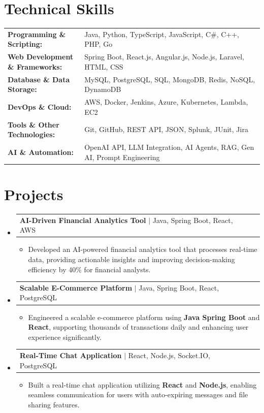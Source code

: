 \documentclass[letterpaper,10pt]{article}
\makeatletter
\newcommand{\resumeItem}[1]{
  \item{\fontsize{8pt}{9pt}\selectfont
    #1 \vspace{-3pt}
  }
}
\newcommand{\resumeProjectHeading}[2]{
    \item
    \begin{tabular*}{1.001\textwidth}{l@{\extracolsep{\fill}}r}
      \fontsize{8.5pt}{10pt}#1 & \textbf{\fontsize{8.5pt}{10pt} #2}\\
    \end{tabular*}\vspace{-7pt}
}
\newcommand{\resumeSubHeadingListStart}{\begin{itemize}[leftmargin=0pt, label={}]}
\newcommand{\resumeSubHeadingListEnd}{\end{itemize}}
\newcommand{\resumeItemListStart}{\begin{itemize}[leftmargin=*]}
\newcommand{\resumeItemListEnd}{\end{itemize}\vspace{-5pt}}
\makeatother
\begin{document}
\section{Technical Skills}
        \vspace{-14pt}
        \begin{table}[h]
            \fontsize{8pt}{9pt}\selectfont
            \begin{tabular}{p{0.3\linewidth} p{0.7\linewidth}}
                \textbf{Programming \& Scripting:} & Java, Python, TypeScript, JavaScript, C\#, C++, PHP, Go \\
                \textbf{Web Development \& Frameworks:} & Spring Boot, React.js, Angular.js, Node.js, Laravel, HTML, CSS \\
                \textbf{Database \& Data Storage:} & MySQL, PostgreSQL, SQL, MongoDB, Redis, NoSQL, DynamoDB \\
                \textbf{DevOps \& Cloud:} & AWS, Docker, Jenkins, Azure, Kubernetes, Lambda, EC2 \\
                \textbf{Tools \& Other Technologies:} & Git, GitHub, REST API, JSON, Splunk, JUnit, Jira \\
                \textbf{AI \& Automation:} & OpenAI API, LLM Integration, AI Agents, RAG, Gen AI, Prompt Engineering \\
            \end{tabular}
        \end{table}
 \vspace{-18pt}

\section{Projects}
    \vspace{-5pt}
    \resumeSubHeadingListStart
          \resumeProjectHeading
            {\textbf{AI-Driven Financial Analytics Tool} $|$ Java, Spring Boot, React, AWS}{}
            \resumeItemListStart
                \resumeItem{Developed an AI-powered financial analytics tool that processes real-time data, providing actionable insights and improving decision-making efficiency by 40\% for financial analysts.}
            \resumeItemListEnd
        \vspace{-12pt}
    
        \resumeProjectHeading
            {\textbf{Scalable E-Commerce Platform} $|$ Java, Spring Boot, React, PostgreSQL}{}
        \resumeItemListStart
                \resumeItem{Engineered a scalable e-commerce platform using \textbf{Java Spring Boot} and \textbf{React}, supporting thousands of transactions daily and enhancing user experience significantly.}
        \resumeItemListEnd
      \vspace{-12pt}
      \resumeProjectHeading
        {\textbf{Real-Time Chat Application} $|$ React, Node.js, Socket.IO, PostgreSQL}{}
    \resumeItemListStart
            \resumeItem{Built a real-time chat application utilizing \textbf{React} and \textbf{Node.js}, enabling seamless communication for users with auto-expiring messages and file sharing features.}
    \resumeItemListEnd
    \resumeSubHeadingListEnd
\end{document}
